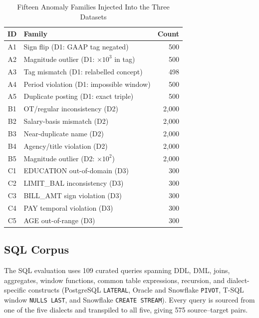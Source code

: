 \documentclass{ieeeaccess}
\begin{document}
\begin{table}[tbp]
\centering
\caption{Fifteen Anomaly Families Injected Into the Three Datasets}
\label{tab:families}
\small
\begin{tabular}{|c|l|r|}
\hline
\textbf{ID} & \textbf{Family} & \textbf{Count} \\
\hline
A1 & Sign flip (D1: GAAP tag negated)            & 500 \\ \hline
A2 & Magnitude outlier (D1: $\times 10^3$ in tag) & 500 \\ \hline
A3 & Tag mismatch (D1: relabelled concept)        & 498 \\ \hline
A4 & Period violation (D1: impossible window)     & 500 \\ \hline
A5 & Duplicate posting (D1: exact triple)         & 500 \\ \hline
B1 & OT/regular inconsistency (D2)                & 2{,}000 \\ \hline
B2 & Salary-basis mismatch (D2)                   & 2{,}000 \\ \hline
B3 & Near-duplicate name (D2)                     & 2{,}000 \\ \hline
B4 & Agency/title violation (D2)                  & 2{,}000 \\ \hline
B5 & Magnitude outlier (D2: $\times 10^2$)        & 2{,}000 \\ \hline
C1 & EDUCATION out-of-domain (D3)                 & 300 \\ \hline
C2 & LIMIT\_BAL inconsistency (D3)                & 300 \\ \hline
C3 & BILL\_AMT sign violation (D3)                & 300 \\ \hline
C4 & PAY temporal violation (D3)                  & 300 \\ \hline
C5 & AGE out-of-range (D3)                        & 300 \\ \hline
\end{tabular}
\end{table}

\subsection{SQL Corpus}

The SQL evaluation uses 109 curated queries spanning DDL, DML, joins, aggregates,
window functions, common table expressions, recursion, and dialect-specific
constructs (PostgreSQL \texttt{LATERAL}, Oracle and Snowflake \texttt{PIVOT},
T-SQL window \texttt{NULLS LAST}, and Snowflake \texttt{CREATE STREAM}). Every
query is sourced from one of the five dialects and transpiled to all five, giving
575 source--target pairs.
\end{document}
